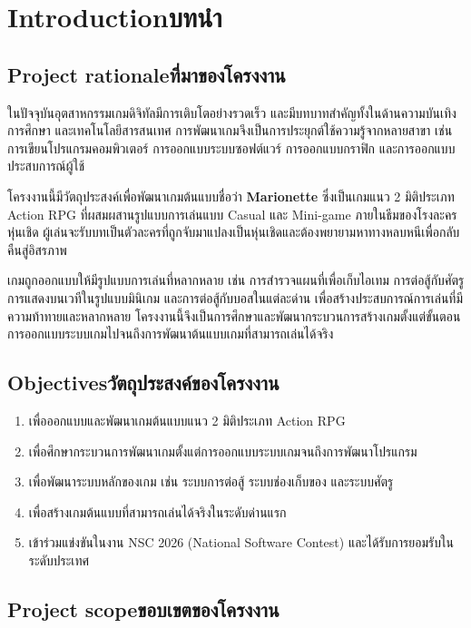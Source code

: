 \chapter{\ifenglish Introduction\else บทนำ\fi}

\section{\ifenglish Project rationale\else ที่มาของโครงงาน\fi}

ในปัจจุบันอุตสาหกรรมเกมดิจิทัลมีการเติบโตอย่างรวดเร็ว และมีบทบาทสำคัญทั้งในด้านความบันเทิง การศึกษา และเทคโนโลยีสารสนเทศ การพัฒนาเกมจึงเป็นการประยุกต์ใช้ความรู้จากหลายสาขา เช่น การเขียนโปรแกรมคอมพิวเตอร์ การออกแบบระบบซอฟต์แวร์ การออกแบบกราฟิก และการออกแบบประสบการณ์ผู้ใช้

โครงงานนี้มีวัตถุประสงค์เพื่อพัฒนาเกมต้นแบบชื่อว่า \textbf{Marionette} ซึ่งเป็นเกมแนว 2 มิติประเภท Action RPG ที่ผสมผสานรูปแบบการเล่นแบบ Casual และ Mini-game ภายในธีมของโรงละครหุ่นเชิด ผู้เล่นจะรับบทเป็นตัวละครที่ถูกจับมาแปลงเป็นหุ่นเชิดและต้องพยายามหาทางหลบหนีเพื่อกลับคืนสู่อิสรภาพ

เกมถูกออกแบบให้มีรูปแบบการเล่นที่หลากหลาย เช่น การสำรวจแผนที่เพื่อเก็บไอเทม การต่อสู้กับศัตรู การแสดงบนเวทีในรูปแบบมินิเกม และการต่อสู้กับบอสในแต่ละด่าน เพื่อสร้างประสบการณ์การเล่นที่มีความท้าทายและหลากหลาย โครงงานนี้จึงเป็นการศึกษาและพัฒนากระบวนการสร้างเกมตั้งแต่ขั้นตอนการออกแบบระบบเกมไปจนถึงการพัฒนาต้นแบบเกมที่สามารถเล่นได้จริง


\section{\ifenglish Objectives\else วัตถุประสงค์ของโครงงาน\fi}
\begin{enumerate}
    \item เพื่อออกแบบและพัฒนาเกมต้นแบบแนว 2 มิติประเภท Action RPG
    \item เพื่อศึกษากระบวนการพัฒนาเกมตั้งแต่การออกแบบระบบเกมจนถึงการพัฒนาโปรแกรม
    \item เพื่อพัฒนาระบบหลักของเกม เช่น ระบบการต่อสู้ ระบบช่องเก็บของ และระบบศัตรู
    \item เพื่อสร้างเกมต้นแบบที่สามารถเล่นได้จริงในระดับด่านแรก
    \item เข้าร่วมแข่งขันในงาน NSC 2026 (National Software Contest) และได้รับการยอมรับในระดับประเทศ
\end{enumerate}

\section{\ifenglish Project scope\else ขอบเขตของโครงงาน\fi}

